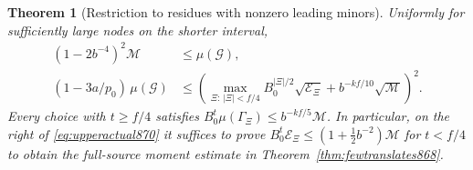 \documentclass[a4paper,11pt]{article}
\newtheorem{theorem}[proposition]{Theorem}
\theoremstyle{definition}
\theoremstyle{remark}
\numberwithin{equation}{section}
\begin{document}
\begin{theorem}[Restriction to residues with nonzero leading minors]
\leavevmode\label{thm:openenergy870}
Uniformly for sufficiently large nodes on the shorter interval,
\begin{align}
 (1-2b^{-4})^2\mathcal M
     &\le \mu(\mathcal G),
 \label{eq:loweractual870}\\
  (1-3a/p_0)\,\mu(\mathcal G)
     &\le\left(
       \max_{\Xi:\,|\Xi|<f/4}B_0^{|\Xi|/2}\sqrt{\mathcal E_\Xi}
               +b^{-kf/10}\sqrt{\mathcal M}\right)^2 .
 \label{eq:upperactual870}
\end{align}
Every choice with \(t\ge f/4\) satisfies
\(B_0^t\mu(\Gamma_\Xi)\le b^{-kf/5}\mathcal M\).
In particular, on the right of \eqref{eq:upperactual870} it
suffices to prove
\(B_0^t\mathcal E_\Xi\le(1+\tfrac12b^{-2})\mathcal M\)
for \(t<f/4\) to obtain the full-source moment estimate in
Theorem~\ref{thm:fewtranslates868}.
\end{theorem}
\end{document}
